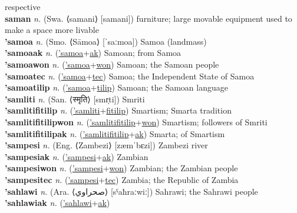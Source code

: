 respective \label{samalon} \\
\textbf{saman} \textit{n.} (Swa. ⟨samani⟩ [samani])
furniture; large movable equipment used to make a space more livable \label{saman} \\
\textbf{'samoa} \textit{n.} (Smo. ⟨Sāmoa⟩ [ˈsaːmoa])
Samoa (landmass) \label{'samoa} \\
\textbf{'samoaak} \textit{n.} (\hyperref['samoa]{'samoa}+\hyperref[ak]{ak})
Samoan; from Samoa \label{'samoaak} \\
\textbf{'samoawon} \textit{n.} (\hyperref['samoa]{'samoa}+\hyperref[won]{won})
Samoan; the Samoan people \label{'samoawon} \\
\textbf{'samoatec} \textit{n.} (\hyperref['samoa]{'samoa}+\hyperref[tec]{tec})
Samoa; the Independent State of Samoa \label{'samoatec} \\
\textbf{'samoatilip} \textit{n.} (\hyperref['samoa]{'samoa}+\hyperref[tilip]{tilip})
Samoan; the Samoan language \label{'samoatilip} \\
\textbf{'samliti} \textit{n.} (San. ⟨स्मृति⟩ [smr̩ti])
Smriti \label{'samliti} \\
\textbf{'samlitifitilip} \textit{n.} (\hyperref['samliti]{'samliti}+\hyperref[fitilip]{fitilip})
Smartism; Smarta tradition \label{'samlitifitilip} \\
\textbf{'samlitifitilipwon} \textit{n.} (\hyperref['samlitifitilip]{'samlitifitilip}+\hyperref[won]{won})
Smartism; followers of Smriti \label{'samlitifitilipwon} \\
\textbf{'samlitifitilipak} \textit{n.} (\hyperref['samlitifitilip]{'samlitifitilip}+\hyperref[ak]{ak})
Smarta; of Smartism \label{'samlitifitilipak} \\
\textbf{'sampesi} \textit{n.} (Eng. ⟨Zambezi⟩ [zæmˈbɛzi])
Zambezi river \label{'sampesi} \\
\textbf{'sampesiak} \textit{n.} (\hyperref['sampesi]{'sampesi}+\hyperref[ak]{ak})
Zambian \label{'sampesiak} \\
\textbf{'sampesiwon} \textit{n.} (\hyperref['sampesi]{'sampesi}+\hyperref[won]{won})
Zambian; the Zambian people \label{'sampesiwon} \\
\textbf{'sampesitec} \textit{n.} (\hyperref['sampesi]{'sampesi}+\hyperref[tec]{tec})
Zambia; the Republic of Zambia \label{'sampesitec} \\
\textbf{'sahlawi} \textit{n.} (Ara. ⟨صحراوي⟩ [sˤaħraːwiː])
Sahrawi; the Sahrawi people \label{'sahlawi} \\
\textbf{'sahlawiak} \textit{n.} (\hyperref['sahlawi]{'sahlawi}+\hyperref[ak]{ak})

